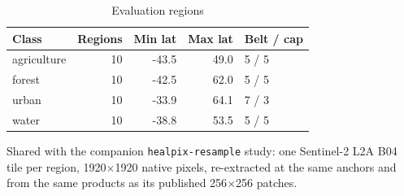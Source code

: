 \begin{table}[t]
\centering
\caption{Evaluation regions}
\label{tab:benchmark_scenes}
\begin{tabular}{lrrrl}
\toprule
Class & Regions & Min lat & Max lat & Belt / cap \\
\midrule
agriculture & 10 & -43.5 & 49.0 & 5 / 5 \\
forest & 10 & -42.5 & 62.0 & 5 / 5 \\
urban & 10 & -33.9 & 64.1 & 7 / 3 \\
water & 10 & -38.8 & 53.5 & 5 / 5 \\
\bottomrule
\end{tabular}
\vspace{3pt}
\begin{minipage}{\columnwidth}
\footnotesize
Shared with the companion \texttt{healpix-resample} study: one Sentinel-2 L2A B04 tile per region, 1920$\times$1920 native pixels, re-extracted at the same anchors and from the same products as its published 256$\times$256 patches.
\end{minipage}
\end{table}
